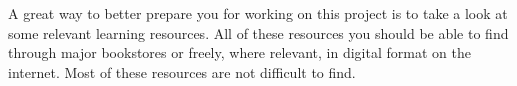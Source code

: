 

A great way to better prepare you for working on this project is to take a look at some relevant learning resources. All of these resources you should be able to find through major bookstores or freely, where relevant, in digital format on the internet. Most of these resources are not difficult to find.





\StopChapter

